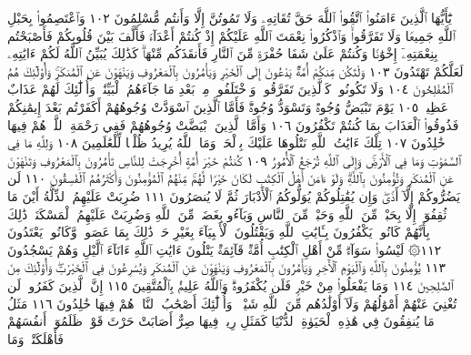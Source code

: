 يَٰٓأَيُّهَا ٱلَّذِينَ ءَامَنُوا۟ ٱتَّقُوا۟ ٱللَّهَ حَقَّ تُقَاتِهِۦ وَلَا تَمُوتُنَّ إِلَّا وَأَنتُم
مُّسْلِمُونَ ١٠٢ وَٱعْتَصِمُوا۟ بِحَبْلِ ٱللَّهِ جَمِيعࣰا وَلَا تَفَرَّقُوا۟ۚ وَٱذْكُرُوا۟
نِعْمَتَ ٱللَّهِ عَلَيْكُمْ إِذْ كُنتُمْ أَعْدَآءࣰ فَأَلَّفَ بَيْنَ قُلُوبِكُمْ
فَأَصْبَحْتُم بِنِعْمَتِهِۦٓ إِخْوَٰنࣰا وَكُنتُمْ عَلَىٰ شَفَا حُفْرَةࣲ مِّنَ
ٱلنَّارِ فَأَنقَذَكُم مِّنْهَاۗ كَذَٰلِكَ يُبَيِّنُ ٱللَّهُ لَكُمْ ءَايَٰتِهِۦ لَعَلَّكُمْ
تَهْتَدُونَ ١٠٣ وَلْتَكُن مِّنكُمْ أُمَّةࣱ يَدْعُونَ إِلَى ٱلْخَيْرِ وَيَأْمُرُونَ
بِٱلْمَعْرُوفِ وَيَنْهَوْنَ عَنِ ٱلْمُنكَرِۚ وَأُو۟لَٰٓئِكَ هُمُ ٱلْمُفْلِحُونَ ١٠٤
وَلَا تَكُونُوا۟ كَٱلَّذِينَ تَفَرَّقُوا۟ وَٱخْتَلَفُوا۟ مِنۢ بَعْدِ مَا جَآءَهُمُ ٱلْبَيِّنَٰتُۚ
وَأُو۟لَٰٓئِكَ لَهُمْ عَذَابٌ عَظِيمࣱ ١٠٥ يَوْمَ تَبْيَضُّ وُجُوهࣱ وَتَسْوَدُّ
وُجُوهࣱۚ فَأَمَّا ٱلَّذِينَ ٱسْوَدَّتْ وُجُوهُهُمْ أَكَفَرْتُم بَعْدَ إِيمَٰنِكُمْ
فَذُوقُوا۟ ٱلْعَذَابَ بِمَا كُنتُمْ تَكْفُرُونَ ١٠٦ وَأَمَّا ٱلَّذِينَ ٱبْيَضَّتْ
وُجُوهُهُمْ فَفِي رَحْمَةِ ٱللَّهِۖ هُمْ فِيهَا خَٰلِدُونَ ١٠٧ تِلْكَ ءَايَٰتُ
ٱللَّهِ نَتْلُوهَا عَلَيْكَ بِٱلْحَقِّۗ وَمَا ٱللَّهُ يُرِيدُ ظُلْمࣰا لِّلْعَٰلَمِينَ ١٠٨
وَلِلَّهِ مَا فِي ٱلسَّمَٰوَٰتِ وَمَا فِي ٱلْأَرْضِۚ وَإِلَى ٱللَّهِ تُرْجَعُ ٱلْأُمُورُ ١٠٩
كُنتُمْ خَيْرَ أُمَّةٍ أُخْرِجَتْ لِلنَّاسِ تَأْمُرُونَ بِٱلْمَعْرُوفِ
وَتَنْهَوْنَ عَنِ ٱلْمُنكَرِ وَتُؤْمِنُونَ بِٱللَّهِۗ وَلَوْ ءَامَنَ أَهْلُ
ٱلْكِتَٰبِ لَكَانَ خَيْرࣰا لَّهُمۚ مِّنْهُمُ ٱلْمُؤْمِنُونَ وَأَكْثَرُهُمُ
ٱلْفَٰسِقُونَ ١١٠ لَن يَضُرُّوكُمْ إِلَّآ أَذࣰىۖ وَإِن يُقَٰتِلُوكُمْ
يُوَلُّوكُمُ ٱلْأَدْبَارَ ثُمَّ لَا يُنصَرُونَ ١١١ ضُرِبَتْ عَلَيْهِمُ
ٱلذِّلَّةُ أَيْنَ مَا ثُقِفُوٓا۟ إِلَّا بِحَبْلࣲ مِّنَ ٱللَّهِ وَحَبْلࣲ مِّنَ ٱلنَّاسِ
وَبَآءُو بِغَضَبࣲ مِّنَ ٱللَّهِ وَضُرِبَتْ عَلَيْهِمُ ٱلْمَسْكَنَةُۚ ذَٰلِكَ
بِأَنَّهُمْ كَانُوا۟ يَكْفُرُونَ بِـَٔايَٰتِ ٱللَّهِ وَيَقْتُلُونَ ٱلْأَنۢبِيَآءَ
بِغَيْرِ حَقࣲّۚ ذَٰلِكَ بِمَا عَصَوا۟ وَّكَانُوا۟ يَعْتَدُونَ ١١٢۞ لَيْسُوا۟
سَوَآءࣰۗ مِّنْ أَهْلِ ٱلْكِتَٰبِ أُمَّةࣱ قَآئِمَةࣱ يَتْلُونَ ءَايَٰتِ ٱللَّهِ
ءَانَآءَ ٱلَّيْلِ وَهُمْ يَسْجُدُونَ ١١٣ يُؤْمِنُونَ بِٱللَّهِ وَٱلْيَوْمِ
ٱلْأٓخِرِ وَيَأْمُرُونَ بِٱلْمَعْرُوفِ وَيَنْهَوْنَ عَنِ ٱلْمُنكَرِ
وَيُسَٰرِعُونَ فِي ٱلْخَيْرَٰتِۖ وَأُو۟لَٰٓئِكَ مِنَ ٱلصَّٰلِحِينَ ١١٤ وَمَا
يَفْعَلُوا۟ مِنْ خَيْرࣲ فَلَن يُكْفَرُوهُۗ وَٱللَّهُ عَلِيمُۢ بِٱلْمُتَّقِينَ ١١٥
إِنَّ ٱلَّذِينَ كَفَرُوا۟ لَن تُغْنِيَ عَنْهُمْ أَمْوَٰلُهُمْ وَلَآ أَوْلَٰدُهُم مِّنَ
ٱللَّهِ شَيْـࣰٔاۖ وَأُو۟لَٰٓئِكَ أَصْحَٰبُ ٱلنَّارِۖ هُمْ فِيهَا خَٰلِدُونَ ١١٦
مَثَلُ مَا يُنفِقُونَ فِي هَٰذِهِ ٱلْحَيَوٰةِ ٱلدُّنْيَا كَمَثَلِ رِيحࣲ فِيهَا
صِرٌّ أَصَابَتْ حَرْثَ قَوْمࣲ ظَلَمُوٓا۟ أَنفُسَهُمْ فَأَهْلَكَتْهُۚ وَمَا
